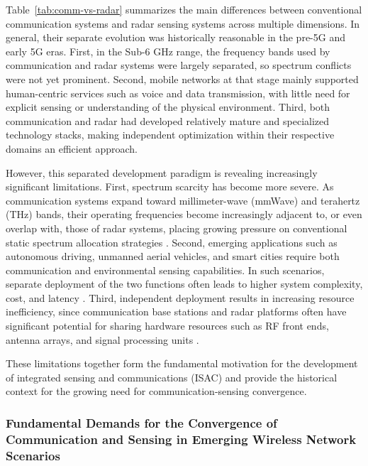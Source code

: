 Table~\ref{tab:comm-vs-radar} summarizes the main differences between conventional communication systems and radar sensing systems across multiple dimensions. In general, their separate evolution was historically reasonable in the pre-5G and early 5G eras. First, in the Sub-6 GHz range, the frequency bands used by communication and radar systems were largely separated, so spectrum conflicts were not yet prominent. Second, mobile networks at that stage mainly supported human-centric services such as voice and data transmission, with little need for explicit sensing or understanding of the physical environment. Third, both communication and radar had developed relatively mature and specialized technology stacks, making independent optimization within their respective domains an efficient approach.

However, this separated development paradigm is revealing increasingly significant limitations. First, spectrum scarcity has become more severe. As communication systems expand toward millimeter-wave (mmWave) and terahertz (THz) bands, their operating frequencies become increasingly adjacent to, or even overlap with, those of radar systems, placing growing pressure on conventional static spectrum allocation strategies \cite{TS38104,Zheng2019RadarCommunicationCoexistence}. Second, emerging applications such as autonomous driving, unmanned aerial vehicles, and smart cities require both communication and environmental sensing capabilities. In such scenarios, separate deployment of the two functions often leads to higher system complexity, cost, and latency \cite{Liu2022ISAC,De2021convergent}. Third, independent deployment results in increasing resource inefficiency, since communication base stations and radar platforms often have significant potential for sharing hardware resources such as RF front ends, antenna arrays, and signal processing units \cite{Liu2020JointRadarComm,Liu2022ISAC}.

These limitations together form the fundamental motivation for the development of integrated sensing and communications (ISAC) and provide the historical context for the growing need for communication-sensing convergence.

\subsubsection{Fundamental Demands for the Convergence of Communication and Sensing in Emerging Wireless Network Scenarios}
\label{subsubsec:ch1-fundamental demands}

